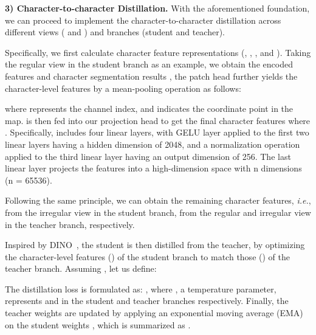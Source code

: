 \documentclass[10pt,twocolumn,letterpaper]{article}
\begin{document}
\noindent \textbf{3) Character-to-character Distillation.}\label{section:sec3.2.3}
With the aforementioned foundation, we can proceed to implement the character-to-character distillation across different views ( and ) and branches (student and teacher).

Specifically, we first calculate character feature representations (, , , and ).
Taking the regular view  in the student branch as an example, we obtain the encoded features  and character segmentation results , the patch head  further yields the character-level features  by a mean-pooling operation as follows:
 {\setlength\abovedisplayskip{1pt}
\setlength\belowdisplayskip{1pt}
}
 
\noindent where  represents the channel index, and  indicates the coordinate point in the map.  is then fed into our projection head  to get the final character features  where . Specifically,  includes four linear layers, with GELU layer applied to the first two linear layers having a hidden dimension of 2048, and a normalization operation~\cite{Dino} applied to the third linear layer having an output dimension of 256. The last linear layer projects the features into a high-dimension space with n dimensions (n = 65536). 

Following the same principle, we can obtain the remaining character features, \emph{i.e.},  from the irregular view in the student branch,  from the regular and irregular view in the teacher branch, respectively.

Inspired by DINO~\cite{Dino}, the student is then distilled from the teacher, by optimizing the character-level features () of the student branch to match those () of the teacher branch. Assuming , let us define:
\begin{small}
  {\setlength\abovedisplayskip{0cm}
  \setlength\belowdisplayskip{0cm}
 }
\end{small}

\noindent The distillation loss is formulated as: , where , a temperature parameter, represents  and  in the student and teacher branches respectively.
Finally, the teacher weights  are updated by applying an exponential moving average (EMA) on the student weights , which is summarized as .
\end{document}
